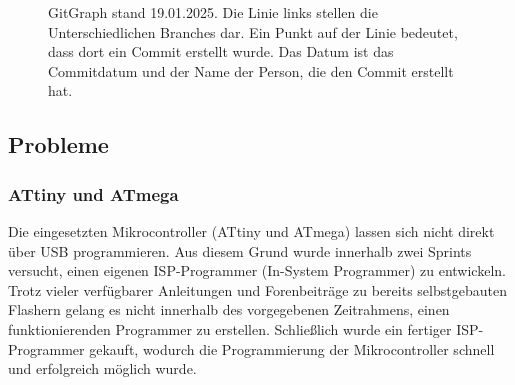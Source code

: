 \begin{figure}[H]
    \centering    
    \caption{GitGraph stand 19.01.2025. Die Linie links stellen die Unterschiedlichen Branches dar. Ein Punkt auf der Linie bedeutet, dass dort ein Commit erstellt wurde. Das Datum ist das Commitdatum und der Name der Person, die den Commit erstellt hat.}
    \label{gitgraph}
\end{figure}

\subsection{Probleme}
\subsubsection{ATtiny und ATmega}
Die eingesetzten Mikrocontroller (ATtiny und ATmega) lassen sich nicht direkt über USB programmieren. Aus diesem Grund wurde innerhalb zwei Sprints versucht, einen eigenen ISP-Programmer (In-System Programmer) zu entwickeln. Trotz vieler verfügbarer Anleitungen und Forenbeiträge zu bereits selbstgebauten Flashern gelang es nicht innerhalb des vorgegebenen Zeitrahmens, einen funktionierenden Programmer zu erstellen. Schließlich wurde ein fertiger ISP-Programmer gekauft, wodurch die Programmierung der Mikrocontroller schnell und erfolgreich möglich wurde.

